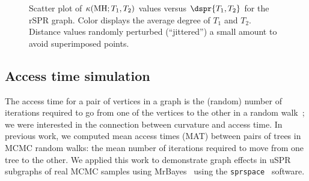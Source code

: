 \documentclass[11pt,onecolumn,conference]{IEEEtran}
\let\MYoriglatexcaption\caption
\renewcommand{\caption}[2][\relax]{\MYoriglatexcaption[#2]{#2}}
\newcommand{\MH}{\operatorname{MH}}
\newcommand{\curvature}[2][]{%
    \ifthenelse{\equal{#1}{}}%
		{\kappa(#2)}%
		{\kappa_{#1}(#2)}%
}
\begin{document}
\begin{figure}
    \caption{Scatter plot of $\curvature{\MH; T_1,T_2}$ values versus $\dspr{T_1,T_2}$ for the rSPR graph. Color displays the average degree of $T_1$ and $T_2$. Distance values randomly perturbed (``jittered'') a small amount to avoid superimposed points.}
	\label{fig:rspr-scatter}
\end{figure}

\subsection{Access time simulation}
The access time for a pair of vertices in a graph is the (random) number of iterations required to go from one of the vertices to the other in a random walk~\cite{lovasz1993random}; we were interested in the connection between curvature and access time.
In previous work, we computed mean access times (MAT) between pairs of trees in  MCMC random walks: the mean number of iterations required to move from one tree to the other.
We applied this work to demonstrate graph effects in uSPR subgraphs of real MCMC samples using MrBayes~\cite{Whidden2015-yi} using the \texttt{sprspace}~\cite{sprspace} software.
\end{document}
